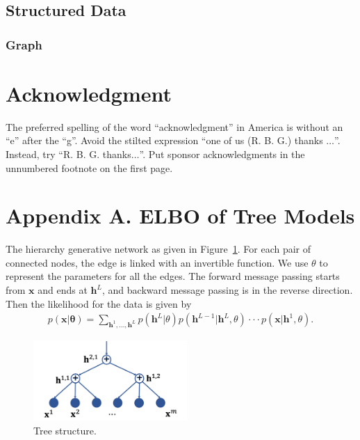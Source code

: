 \documentclass[conference]{IEEEtran}
\begin{document}
\subsection{Structured Data}
\subsubsection{Graph}


\section*{Acknowledgment}

The preferred spelling of the word ``acknowledgment'' in America is without 
an ``e'' after the ``g''. Avoid the stilted expression ``one of us (R. B. 
G.) thanks $\ldots$''. Instead, try ``R. B. G. thanks$\ldots$''. Put sponsor 
acknowledgments in the unnumbered footnote on the first page.




\clearpage
\section*{Appendix A.  ELBO of Tree Models}\label{appd:tree_elbo}

The hierarchy generative network as given in Figure~\ref{fig:tree-d}. For each pair of connected nodes, the edge is linked with an invertible function. We use $\theta$ to represent the parameters for all the edges.
The forward message passing starts from $\mathbf{x}$ and ends at $\mathbf{h}^L$, and backward message passing is in the reverse direction. 
 Then the
 likelihood for the data is given by
\begin{align*}
p(\mathbf{x}| \mathbf{\theta}) = \sum_{\mathbf{h}^1, ..., \mathbf{h}^L} p(\mathbf{h}^L | \theta)p(\mathbf{h}^{L-1} | \mathbf{h}^{L},\theta) \cdot \cdot  \cdot  p(\mathbf{x} | \mathbf{h}^{1}, \theta) .
\end{align*}

\begin{figure}[!htbp]
    \centering
    \includegraphics[width=2.3in]{fig/tree_direct.png}
    \caption{Tree structure.}
    \label{fig:tree-d}
\end{figure}
\end{document}
